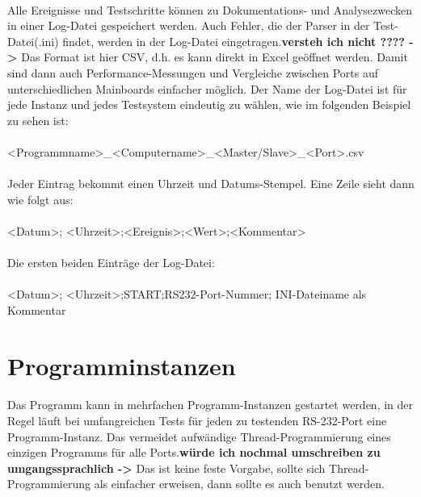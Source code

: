 \paragraph{}
Alle Ereignisse und Testschritte können zu Dokumentations- und Analysezwecken in einer Log-Datei gespeichert werden. Auch Fehler, die der Parser in der Test-Datei(.ini) findet, werden in der Log-Datei eingetragen.\textbf{versteh ich nicht ???? ->} Das Format ist hier CSV, d.h. es kann direkt in Excel geöffnet werden. Damit sind dann auch Performance-Messungen und Vergleiche zwischen Ports auf unterschiedlichen Mainboards einfacher möglich. Der Name der Log-Datei ist für jede Instanz und jedes Testsystem eindeutig zu wählen, wie im folgenden Beispiel zu sehen ist:
\\
\\ \hspace*{10mm}<Programmname>\_<Computername>\_<Master/Slave>\_<Port>.csv

\paragraph{}
Jeder Eintrag bekommt einen Uhrzeit und Datums-Stempel. Eine Zeile sieht dann wie folgt aus:
\\
\\ \hspace*{10mm} <Datum>; <Uhrzeit>;<Ereignis>;<Wert>;<Kommentar>

\paragraph{}
Die ersten beiden  Einträge der Log-Datei:
\\
\\ \hspace*{10mm} <Datum>; <Uhrzeit>;START;RS232-Port-Nummer; INI-Dateiname als Kommentar



\section{Programminstanzen}
\paragraph{}
Das Programm kann in mehrfachen Programm-Instanzen gestartet werden, in der Regel läuft bei umfangreichen Tests für jeden zu testenden RS-232-Port eine Programm-Instanz. Das vermeidet aufwändige Thread-Programmierung eines einzigen Programms für alle Ports.\textbf{würde ich nochmal umschreiben zu umgangssprachlich ->} Das ist keine feste Vorgabe, sollte sich Thread-Programmierung als einfacher erweisen, dann sollte es auch benutzt werden.


